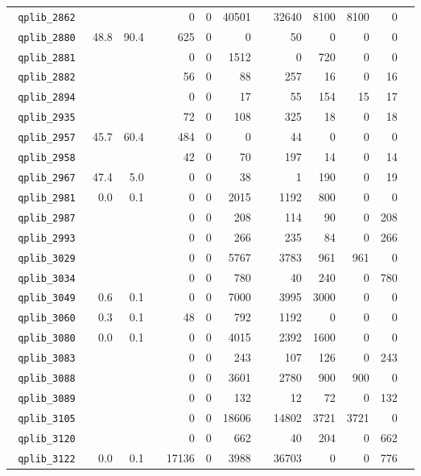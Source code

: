 {\begin{longtable}{lrrrrrrrrrrrr}
\texttt{ 	qplib\_2862	}	&		&		&	&	0	&	0	&	40501	&	&	32640	&	8100	&	8100	&	0	\\
\texttt{ 	qplib\_2880	}	&	48.8	&	90.4	&	&	625	&	0	&	0	&	&	50	&	0	&	0	&	0	\\
\texttt{ 	qplib\_2881	}	&		&		&	&	0	&	0	&	1512	&	&	0	&	720	&	0	&	0	\\
\texttt{ 	qplib\_2882	}	&		&		&	&	56	&	0	&	88	&	&	257	&	16	&	0	&	16	\\
\texttt{ 	qplib\_2894	}	&		&		&	&	0	&	0	&	17	&	&	55	&	154	&	15	&	17	\\
\texttt{ 	qplib\_2935	}	&		&		&	&	72	&	0	&	108	&	&	325	&	18	&	0	&	18	\\
\texttt{ 	qplib\_2957	}	&	45.7	&	60.4	&	&	484	&	0	&	0	&	&	44	&	0	&	0	&	0	\\
\texttt{ 	qplib\_2958	}	&		&		&	&	42	&	0	&	70	&	&	197	&	14	&	0	&	14	\\
\texttt{ 	qplib\_2967	}	&	47.4	&	5.0	&	&	0	&	0	&	38	&	&	1	&	190	&	0	&	19	\\
\texttt{ 	qplib\_2981	}	&	0.0	&	0.1	&	&	0	&	0	&	2015	&	&	1192	&	800	&	0	&	0	\\
\texttt{ 	qplib\_2987	}	&		&		&	&	0	&	0	&	208	&	&	114	&	90	&	0	&	208	\\
\texttt{ 	qplib\_2993	}	&		&		&	&	0	&	0	&	266	&	&	235	&	84	&	0	&	266	\\
\texttt{ 	qplib\_3029	}	&		&		&	&	0	&	0	&	5767	&	&	3783	&	961	&	961	&	0	\\
\texttt{ 	qplib\_3034	}	&		&		&	&	0	&	0	&	780	&	&	40	&	240	&	0	&	780	\\
\texttt{ 	qplib\_3049	}	&	0.6	&	0.1	&	&	0	&	0	&	7000	&	&	3995	&	3000	&	0	&	0	\\
\texttt{ 	qplib\_3060	}	&	0.3	&	0.1	&	&	48	&	0	&	792	&	&	1192	&	0	&	0	&	0	\\
\texttt{ 	qplib\_3080	}	&	0.0	&	0.1	&	&	0	&	0	&	4015	&	&	2392	&	1600	&	0	&	0	\\
\texttt{ 	qplib\_3083	}	&		&		&	&	0	&	0	&	243	&	&	107	&	126	&	0	&	243	\\
\texttt{ 	qplib\_3088	}	&		&		&	&	0	&	0	&	3601	&	&	2780	&	900	&	900	&	0	\\
\texttt{ 	qplib\_3089	}	&		&		&	&	0	&	0	&	132	&	&	12	&	72	&	0	&	132	\\
\texttt{ 	qplib\_3105	}	&		&		&	&	0	&	0	&	18606	&	&	14802	&	3721	&	3721	&	0	\\
\texttt{ 	qplib\_3120	}	&		&		&	&	0	&	0	&	662	&	&	40	&	204	&	0	&	662	\\
\texttt{ 	qplib\_3122	}	&	0.0	&	0.1	&	&	17136	&	0	&	3988	&	&	36703	&	0	&	0	&	776	\\

\end{longtable}}
